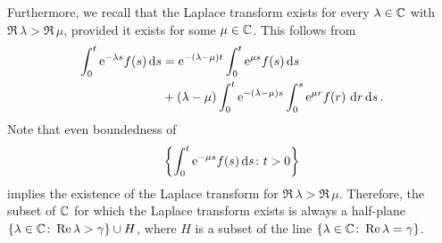 Furthermore, we recall that the Laplace transform exists for every $\lambda \in \mathbb{C}$ with $\Re\,\lambda > \Re\,\mu$, provided it exists for some $\mu\in\mathbb{C}$.
This follows from 
\begin{align}\label{eq:a4-1.1}
\int_0^t \mathrm{e}^{-\lambda s} f(s) \mathop{}\!\mathrm{d}{s} &= \mathrm{e}^{-(\lambda-\mu)t} \int_{0}^{t} \mathrm{e}^{\mu s} f(s)  \mathop{}\!\mathrm{d}{s} \\ 
&+ (\lambda - \mu) \int_{0}^{t} \mathrm{e}^{-(\lambda-\mu)s} \int_{0}^{s} \mathrm{e}^{\mu r} f(r) \,\mathop{}\!\mathrm{d}{r} \mathop{}\!\mathrm{d}{s} \,. \notag
\end{align}
Note that even boundedness of 
\[
\left\{ \int_{0}^{t} \mathrm{e}^{-\mu s}f(s)  \mathop{}\!\mathrm{d}{s} \colon t > 0\right\}
\]
implies the existence of the Laplace transform for $\Re\,\lambda > \Re\,\mu$. 
Therefore, the subset of $\mathbb{C}$ for which the Laplace transform exists is always a half-plane 
$\{\lambda \in \mathbb{C}\colon\mathop{}\!\mathrm{Re}\,\lambda > \gamma\} \cup H$, where $H$ is a subset of the line $\{\lambda \in \mathbb{C}\colon\mathop{}\!\mathrm{Re}\,\lambda = \gamma\}$.

